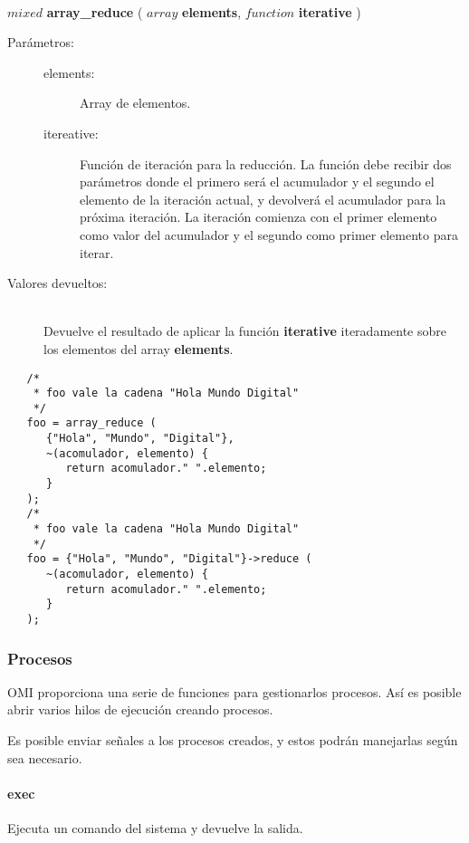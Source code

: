 \begin{framed}
\hfill \\ $mixed$ \textbf{array\_reduce} ( $array$ \textbf{elements}, $function$ \textbf{iterative} )  
\begin{description}
\item [Parámetros:] \hfill 
   \begin{description}
   \item[elements:] Array de elementos.
   \item[itereative:] Función de iteración para la reducción. La función debe recibir dos parámetros donde el primero
   será el acumulador y el segundo el elemento de la iteración actual, y devolverá el acumulador para la próxima iteración.
   La iteración comienza con el primer elemento como valor del acumulador y el segundo como primer elemento para iterar.
   \end{description}
\item[Valores devueltos:] \hfill \\
   Devuelve el resultado de aplicar la función \textbf{iterative} iteradamente sobre los elementos del array \textbf{elements}.
\end{description}
\end{framed}
     
\begin{lstlisting}   
   /*
    * foo vale la cadena "Hola Mundo Digital"
    */
   foo = array_reduce (
      {"Hola", "Mundo", "Digital"}, 
      ~(acomulador, elemento) { 
         return acomulador." ".elemento;
      }
   ); 
   /*
    * foo vale la cadena "Hola Mundo Digital"
    */
   foo = {"Hola", "Mundo", "Digital"}->reduce (
      ~(acomulador, elemento) { 
         return acomulador." ".elemento;
      }
   );
\end{lstlisting}

\subsubsection{Procesos}
OMI proporciona una serie de funciones para gestionarlos procesos. Así es posible abrir varios
hilos de ejecución creando procesos.

Es posible enviar señales a los procesos creados, y estos podrán manejarlas según sea necesario. 

\paragraph{exec}
Ejecuta un comando del sistema y devuelve la salida.

